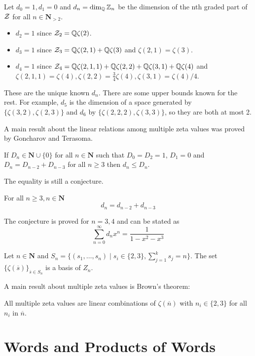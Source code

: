 Let $d_0 = 1, d_1 = 0$ and $d_n = \dim_{\mathbb{Q}} \mathbb{Z}_n$ be the dimension of the nth graded part of $\mathcal{Z}$ for all $n \in \mathbf{N}_{>2}$. 
\begin{itemize}
\item $d_2 = 1$ since $\mathcal{Z}_2 = \mathbb{Q} \zeta(2)$.
\item $d_3 = 1$ since $\mathcal{Z}_3 = \mathbb{Q} \zeta(2, 1) + \mathbb{Q} \zeta(3)$ and $\zeta(2, 1) = \zeta(3)$.
\item $d_4 = 1$ since $\mathcal{Z}_4 = \mathbb{Q} \zeta(2, 1, 1) + \mathbb{Q}\zeta(2, 2) + \mathbb{Q} \zeta(3, 1) + \mathbb{Q} \zeta(4)$ and $\zeta(2, 1, 1) = \zeta(4), \zeta(2, 2) = \frac{3}{4} \zeta(4), \zeta(3, 1) = \zeta(4)/4$.
\end{itemize}

These are the unique known $d_n$. There are some upper bounds known for the rest. For example, $d_5$ is the dimension of a space generated by $\{ \zeta(3, 2), \zeta(2, 3) \}$ and $d_6$ by $\{ \zeta(2, 2, 2), \zeta(3, 3) \}$, so they are both at most 2.

A main result about the linear relations among multiple zeta values was proved by Goncharov and Terasoma.
\begin{thm}
If $D_n \in \mathbf{N} \cup \{0\}$ for all $n \in \mathbf{N}$ such that $D_0 = D_2 = 1$, $D_1 = 0$ and $D_n = D_{n-2} + D_{n-3}$ for all $n \geq 3$ then $d_n \leq D_n$.
\end{thm}
The equality is still a conjecture.
\begin{conj}[Zagier 1992]
For all $n \geq 3, n \in \mathbf{N}$
\[
d_n = d_{n - 2} + d_{n -3}
\]
\end{conj}

The conjecture is proved for $n = 3,4$ and can be stated as
\[
\sum_{n=0}^{\infty} d_n x^n = \frac{1}{1 - x^2 - x^3}
\]
\begin{conj}[Hoffman 1997]
Let $n \in \mathbf{N}$ and $S_n = \{ (s_1, \ldots, s_n) \mid s_i \in \{2, 3\}, \sum_{j = 1}^k s_j = n \}$. The set $\{ \zeta(\overline{s})\}_{\overline{s} \in S_n}$ is a basis of $Z_n$.
\end{conj}

A main result about multiple zeta values is Brown's theorem:
\begin{thm}[Brown]
All multiple zeta values are linear combinations of $\zeta(\overline{n})$ with $n_i \in \{2,3\}$ for all $n_i$ in $\overline{n}$.
\end{thm}

\section{Words and Products of Words}

